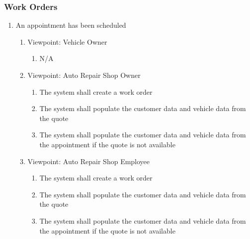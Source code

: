 \documentclass[12pt]{article}
\begin{document}
\subsubsection{Work Orders}
\begin{enumerate}[resume*=business_events]
	\item An appointment has been scheduled
	      \begin{enumerate}[VP\arabic*.]
		      \item Viewpoint: Vehicle Owner
		            \begin{enumerate}
			            \item[] N/A
		            \end{enumerate}
		      \item Viewpoint: Auto Repair Shop Owner
		            \begin{enumerate}
			            \item The system shall create a work order
			            \item The system shall populate the customer data and vehicle data from the quote
			            \item The system shall populate the customer data and vehicle data from the appointment if the quote is
			                  not available
		            \end{enumerate}
		      \item Viewpoint: Auto Repair Shop Employee
		            \begin{enumerate}
			            \item The system shall create a work order
			            \item The system shall populate the customer data and vehicle data from the quote
			            \item The system shall populate the customer data and vehicle data from the appointment if the quote is
			                  not available
		            \end{enumerate}
	      \end{enumerate}


\end{enumerate}
\end{document}
